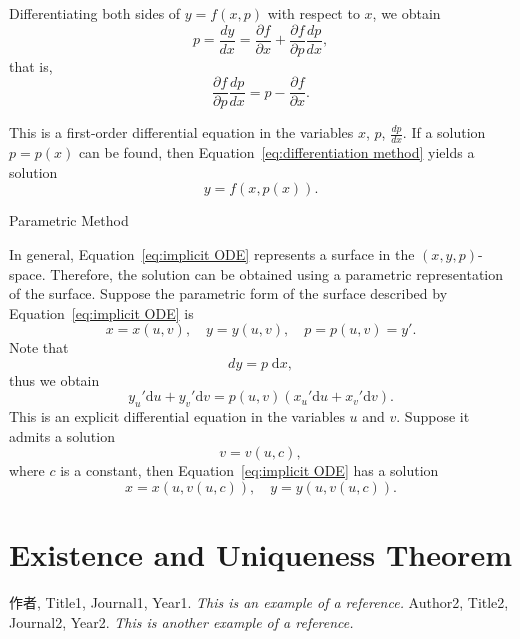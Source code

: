 \documentclass[11pt]{elegantbook}
\begin{document}
Differentiating both sides of \(y = f(x, p)\) with respect to \(x\), we obtain
\[
p = \frac{dy}{dx} = \frac{\partial f}{\partial x} + \frac{\partial f}{\partial p} \frac{dp}{dx},
\]
that is,
\begin{equation*}
\frac{\partial f}{\partial p} \frac{dp}{dx} = p - \frac{\partial f}{\partial x}.
\end{equation*}

This is a first-order differential equation in the variables \(x\), \(p\), \(\frac{dp}{dx}\). 
If a solution \(p = p(x)\) can be found, then Equation~\eqref{eq:differentiation method} yields a solution
\[
y = f(x, p(x)).
\]
\begin{leftbarTitle}{Parametric Method}\end{leftbarTitle}
In general, Equation~\eqref{eq:implicit ODE} represents a surface in the \((x, y, p)\)-space. 
Therefore, the solution can be obtained using a parametric representation of the surface. 
Suppose the parametric form of the surface described by Equation~\eqref{eq:implicit ODE} is
\[
x = x(u, v),\quad y = y(u, v),\quad p = p(u, v) = y'.
\]
Note that
\[
dy = p \; \mathrm{d}x,
\]
thus we obtain
\[
y_u' \mathrm{d}u + y_v' \mathrm{d}v = p(u, v)(x_u' \mathrm{d}u + x_v' \mathrm{d}v).
\]
This is an explicit differential equation in the variables \(u\) and \(v\). Suppose it admits a solution
\[
v = v(u, c),
\]
where \(c\) is a constant, then Equation~\eqref{eq:implicit ODE} has a solution
\[
x = x(u, v(u, c)),\quad y = y(u, v(u, c)).
\]

\chapter{Existence and Uniqueness Theorem}


\begin{thebibliography}{99} 
 作者, Title1, Journal1, Year1. \emph{ This is an example of a reference.}
 Author2, Title2, Journal2, Year2. \emph{ This is another example of a reference.}
\end{thebibliography}
\end{document}
